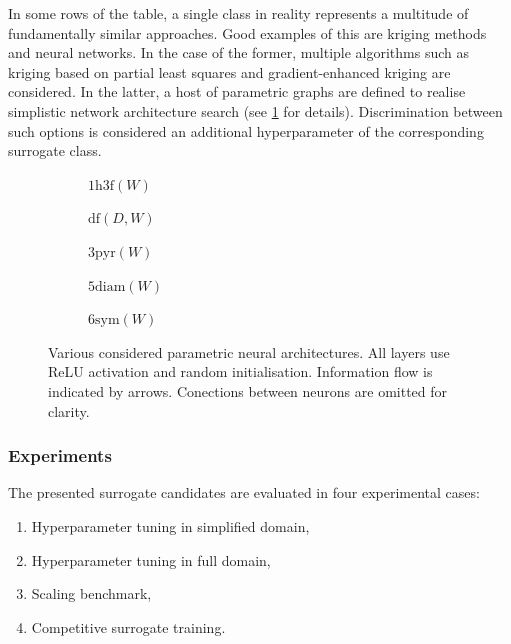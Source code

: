 In some rows of the table, a single class in reality represents a multitude of
fundamentally similar approaches. Good examples of this are kriging methods and neural
networks. In the case of the former, multiple algorithms such as kriging based on
partial least squares and gradient-enhanced kriging are considered. In the
latter, a host of parametric graphs are defined to realise simplistic network
architecture search (see \cref{fig:nn-archs} for details). Discrimination
between such options is considered an additional hyperparameter of the
corresponding surrogate class.

\begin{figure}[h]
	\centering
	\begin{subfigure}[b]{0.20\textwidth}
		\centering
		{\footnotesize {}}
		\caption{$\text{1h3f}(W)$}
	\end{subfigure}\hfill%
	\begin{subfigure}[b]{0.15\textwidth}
		\centering
		{\footnotesize {}}
		\caption{$\text{df}(D,W)$}
	\end{subfigure}\hfill%
	\begin{subfigure}[b]{0.15\textwidth}
		\centering
		{\footnotesize {}}
		\caption{$\text{3pyr}(W)$}
	\end{subfigure}\hfill%
	\begin{subfigure}[b]{0.20\textwidth}
		\centering
		{\footnotesize {}}
		\caption{$\text{5diam}(W)$}
	\end{subfigure}\hfill%
	\begin{subfigure}[b]{0.20\textwidth}
		\centering
		{\footnotesize {}} %
		\caption{$\text{6sym}(W)$}
	\end{subfigure}

	\caption{Various considered parametric neural architectures. All layers use ReLU
		activation and random initialisation. Information flow is indicated by
		arrows. Conections between neurons are omitted for clarity.}
	\label{fig:nn-archs}
\end{figure}

\subsubsection{Experiments}

The presented surrogate candidates are evaluated in four experimental cases:

\begin{enumerate}
	
	\item Hyperparameter tuning in simplified domain,

	\item Hyperparameter tuning in full domain,

	\item Scaling benchmark,

	\item Competitive surrogate training.
\end{enumerate}

